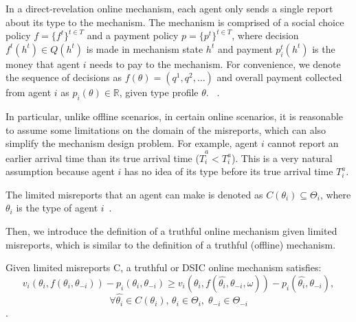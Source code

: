 \documentclass[11pt]{phdthesis}
\begin{document}
\begin{definition}
	In a direct-revelation online mechanism, each agent only sends a single report about its type to the mechanism. The mechanism is comprised of a social choice policy $f =\{f^t\}^{t\in T}$ and a payment policy $p = \{p^t\}^{t\in T}$, where decision $ f^t(h^t) \in Q(h^t) $ is made in mechanism state $ h^t $ and payment $ p_i^t(h^t) $ is the money that agent $ i $ needs to pay to the mechanism. For convenience, we denote the sequence of decisions as $f(\theta) = (q^1,q^2,\ldots)$ and overall payment collected from agent $i$ as $p_i(\theta) \in \mathbb{R}$, given type profile $ \theta $. ~\citep[Definition 16.2]{nisan2007algorithmic}.
\end{definition}

In particular, unlike offline scenarios, in certain online scenarios, it is reasonable to assume some limitations on the domain of the misreports, which can also simplify the mechanism design problem. For example, agent $ i $ cannot report an earlier arrival time than its true arrival time ($ \hat{T}_i^a < T_i^a $). This is a very natural assumption because agent $ i $ has no idea of its type before its true arrival time $ T_i^a $. 

\begin{definition}
	The limited misreports that an agent can make is denoted as $C(\theta_i) \subseteq \Theta_i$, where $\theta_i$ is the type of agent $i$~\citep[Definition 16.4]{nisan2007algorithmic}.
\end{definition}

%

Then, we introduce the definition of a truthful online mechanism given limited misreports, which is similar to the definition of a truthful (offline) mechanism.

\begin{definition}[truthful]
	Given limited misreports C, a truthful or DSIC online mechanism satisfies:
	\[ v_i(\theta_i,f(\theta_i,\theta_{-i})) - p_i(\theta_i,\theta_{-i}) \geq v_i(\theta_i,f(\hat{\theta_i},\theta_{-i},\omega)) - p_i(\hat{\theta_i},\theta_{-i}), \]
	\[ \forall \hat{\theta_i} \in C(\theta_i), \, \theta_i \in \Theta_i, \;  \theta_{-i} \in \Theta_{-i} \]
	\citep[Definition 16.5]{nisan2007algorithmic}.
\end{definition}
\end{document}
